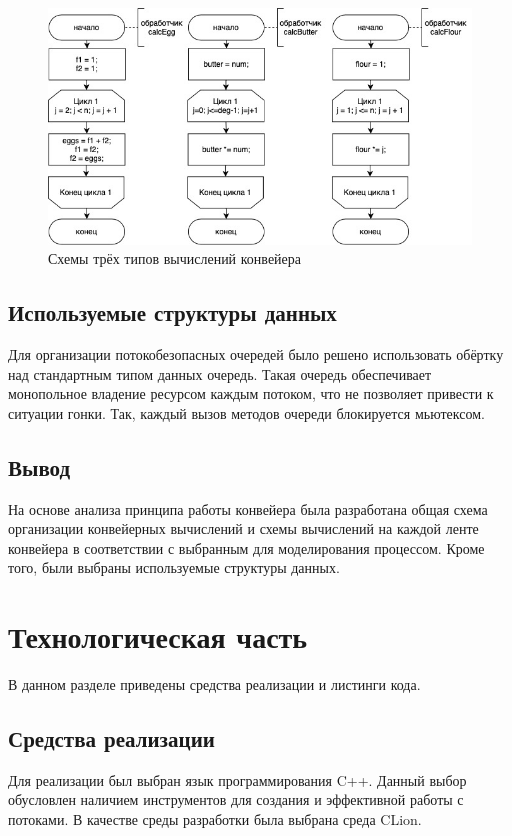 \documentclass[12pt]{report}
\begin{document}
\begin{figure}[h]
	\centering
	\includegraphics[width = \linewidth]{steps.jpg}
	\caption{Схемы трёх типов вычислений конвейера}
	\label{fig:steps}
\end{figure}
\section{Используемые структуры данных}
Для организации потокобезопасных очередей было решено использовать обёртку над стандартным типом данных очередь. Такая очередь обеспечивает монопольное владение ресурсом каждым потоком, что не позволяет привести к ситуации гонки. Так, каждый вызов методов очереди блокируется мьютексом.
\section*{Вывод}
На основе анализа принципа работы конвейера была разработана общая схема организации конвейерных вычислений и схемы вычислений на каждой ленте конвейера в соответствии с выбранным для моделирования процессом. Кроме того, были выбраны используемые структуры данных.

\chapter{Технологическая часть}

В данном разделе приведены средства реализации и листинги кода.

\section{Средства реализации}
Для реализации был выбран язык программирования C++. Данный выбор обусловлен наличием инструментов для создания и эффективной работы с потоками. В качестве среды разработки была выбрана среда CLion.
\end{document}

